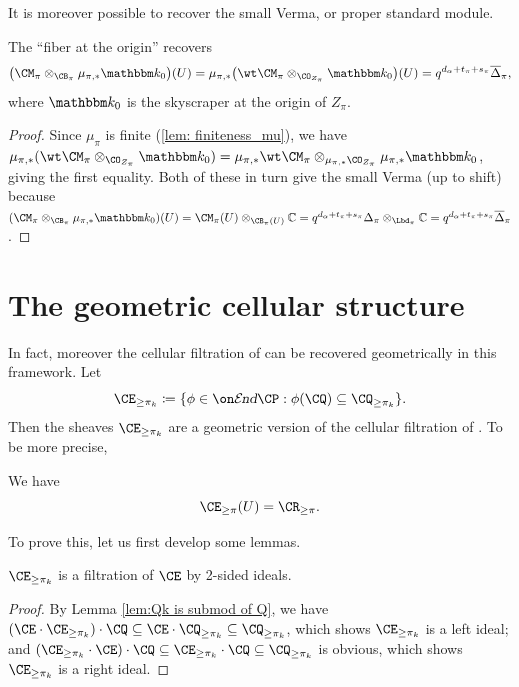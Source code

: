 \documentclass[11pt,reqno]{amsart}
\begin{document}
It is moreover possible to recover the small Verma, or proper standard module.
\begin{theorem}\label{thm:small verma}
    The ``fiber at the origin'' recovers
    \[\big(\CM_{\pi}\otimes_{\CB_\pi} \mu_{\pi,*}\bk_0\big)(U)=\mu_{\pi,*}\big(\wt\CM_\pi\otimes_{\CO_{Z_\pi}}\bk_0\big)(U)=q^{d_\alpha+t_\pi+s_\pi}\ol\Delta_{\pi},\]
    where $\bk_0$ is the skyscraper at the origin of $Z_\pi$. 
\end{theorem}
\begin{proof}
    Since $\mu_\pi$ is finite (\ref{lem: finiteness_mu}), we have $\mu_{\pi,*}(\wt\CM_\pi\otimes_{\CO_{Z_\pi}}\bk_0)=\mu_{\pi,*}\wt\CM_\pi\otimes_{\mu_{\pi,*}\CO_{Z_\pi}} \mu_{\pi,*}\bk_0$, giving the first equality. Both of these in turn give the small Verma (up to shift) because $(\CM_{\pi}\otimes_{\CB_\pi} \mu_{\pi,*}\bk_0)(U)=\CM_\pi(U)\otimes_{\CB_\pi(U)} \BC=q^{d_\alpha+t_\pi+s_\pi}\Delta_\pi\otimes_{\Lbd_\pi} \BC=q^{d_\alpha+t_\pi+s_\pi}\ol\Delta_\pi$. 
\end{proof}




\section{The geometric cellular structure}
In fact, moreover the cellular filtration of \cite{kleshchev2013affine} can be recovered geometrically in this framework. Let
\[\CE_{\ge\pi_k}\coloneqq\{\phi\in \shend\CP:\phi(\CQ)\subseteq \CQ_{\ge\pi_k}\}.\]
Then the sheaves $\CE_{\ge\pi_k}$ are a geometric version of the cellular filtration of \cite{kleshchev2013affine}. To be more precise,
\begin{theorem}\label{thm:cellular E}
    We have
    \[\CE_{\ge \pi}(U)=\CR_{\ge\pi}.\] 
\end{theorem}
To prove this, let us first develop some lemmas.
\begin{claim}\label{claim:cellular E 1}
    $\CE_{\ge\pi_k}$ is a filtration of $\CE$ by 2-sided ideals.
\end{claim}
\begin{proof}
    By Lemma \ref{lem:Qk is submod of Q}, we have $(\CE\cdot \CE_{\ge\pi_k})\cdot\CQ\subseteq\CE\cdot\CQ_{\ge\pi_k}\subseteq\CQ_{\ge\pi_k}$, which shows $\CE_{\ge\pi_k}$ is a left ideal; and $(\CE_{\ge\pi_k}\cdot\CE)\cdot\CQ\subseteq\CE_{\ge\pi_k}\cdot\CQ\subseteq\CQ_{\ge\pi_k}$ is obvious, which shows $\CE_{\ge\pi_k}$ is a right ideal.
\end{proof}
\end{document}
